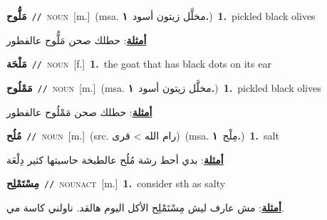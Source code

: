 \documentclass[10pt,a4paper,twoside]{article} %
\begin{document}
\begin{multicols}{2}
{\setlength\topsep{0pt}\textbf{\foreignlanguage{arabic}{مَلُّوح}}\ {\color{gray}\texttt{//}\color{black}}\ \textsc{noun}\ [m.]\ \color{gray}(msa. \foreignlanguage{arabic}{مخلَّل زيتون أسود}~\foreignlanguage{arabic}{\textbf{١.}})\color{black}\ \textbf{1.}~pickled black olives\  \begin{flushright}\color{gray}\foreignlanguage{arabic}{\textbf{\underline{\foreignlanguage{arabic}{أمثلة}}}: حطلك صحن مَلُّوح عالفطور}\end{flushright}\color{black}} \vspace{2mm}

{\setlength\topsep{0pt}\textbf{\foreignlanguage{arabic}{مَلْحَة}}\ {\color{gray}\texttt{//}\color{black}}\ \textsc{noun}\ [f.]\ \textbf{1.}~the goat that has black dots on its ear\ } \vspace{2mm}

{\setlength\topsep{0pt}\textbf{\foreignlanguage{arabic}{مَمْلُوح}}\ {\color{gray}\texttt{//}\color{black}}\ \textsc{noun}\ [m.]\ \color{gray}(msa. \foreignlanguage{arabic}{مخلَّل زيتون أسود}~\foreignlanguage{arabic}{\textbf{١.}})\color{black}\ \textbf{1.}~pickled black olives\  \begin{flushright}\color{gray}\foreignlanguage{arabic}{\textbf{\underline{\foreignlanguage{arabic}{أمثلة}}}: حطلك صحن مَمْلُوح عالفطور}\end{flushright}\color{black}} \vspace{2mm}

{\setlength\topsep{0pt}\textbf{\foreignlanguage{arabic}{مُلُح}}\ {\color{gray}\texttt{//}\color{black}}\ \textsc{noun}\ [m.]\ (src. \color{gray}\foreignlanguage{arabic}{رام الله > قرى}\color{black})\ \color{gray}(msa. \foreignlanguage{arabic}{مِلْح}~\foreignlanguage{arabic}{\textbf{١.}})\color{black}\ \textbf{1.}~salt\  \begin{flushright}\color{gray}\foreignlanguage{arabic}{\textbf{\underline{\foreignlanguage{arabic}{أمثلة}}}: بدي أحط رشة مُلُح عالطبخة حاسيتها كثير دِلْعَة}\end{flushright}\color{black}} \vspace{2mm}

{\setlength\topsep{0pt}\textbf{\foreignlanguage{arabic}{مِسْتَمْلِح}}\ {\color{gray}\texttt{//}\color{black}}\ \textsc{noun\textunderscore act}\ [m.]\ \textbf{1.}~consider sth as salty\  \begin{flushright}\color{gray}\foreignlanguage{arabic}{\textbf{\underline{\foreignlanguage{arabic}{أمثلة}}}: مش عارف ليش مِسْتَمْلِح الأكل اليوم هالقد. ناولني كاسة مي.}\end{flushright}\color{black}} \vspace{2mm}


\end{multicols}
\end{document}

